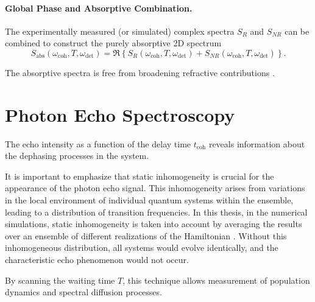 \paragraph{Global Phase and Absorptive Combination.}

\noindent 
The experimentally measured (or simulated) complex spectra $S_{R}$ and $S_{NR}$ can be combined to  construct the purely absorptive 2D spectrum \cite{mukamel1995principlesnonlinearoptical, jonas2003twodimensionalfemtosecondspectroscopy, greenetal2024vibrationalcoherenceshalfbroadband}
\begin{equation}
	S_{\text{abs}}(\omega_{\text{coh}}, T, \omega_{\text{det}})
	=
	\Re \left\{
	S_{R}(\omega_{\text{coh}}, T, \omega_{\text{det}}) + S_{NR}(\omega_{\text{coh}}, T, \omega_{\text{det}})
	\right\}.
	\label{eq:absorptive_spectrum}
\end{equation}

\noindent 
The absorptive spectra is free from broadening refractive contributions \cite{fullerogilvie2015experimentalimplementationstwodimensional}.



\section{Photon Echo Spectroscopy}
\label{sec:photon_echo}
\noindent 
The echo intensity as a function of the delay time $t_{\text{coh}}$ reveals information about the dephasing processes in the system.

\noindent 
It is important to emphasize that static inhomogeneity is crucial for the appearance of the photon echo signal. This inhomogeneity arises from variations in the local environment of individual quantum systems within the ensemble, leading to a distribution of transition frequencies. In this thesis, in the numerical simulations, static inhomogeneity is taken into account by averaging the results over an ensemble of different realizations of the Hamiltonian \cite{cho2009twodimensionalopticalspectroscopy, mukamel1995principlesnonlinearoptical}. Without this inhomogeneous distribution, all systems would evolve identically, and the characteristic echo phenomenon would not occur.

\noindent 
By scanning the waiting time $T$, this technique allows measurement of population dynamics and spectral diffusion processes.

